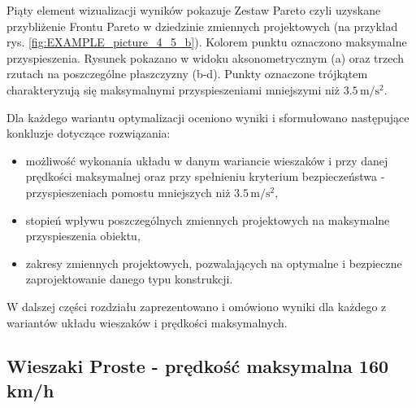 Piąty element wizualizacji wyników pokazuje Zestaw Pareto czyli uzyskane przybliżenie Frontu Pareto w dziedzinie zmiennych projektowych (na przykład rys. \ref{fig:EXAMPLE_picture_4_5_b}). Kolorem punktu oznaczono maksymalne przyspieszenia. Rysunek pokazano w widoku aksonometrycznym (a) oraz trzech rzutach na poszczególne płaszczyzny (b-d). Punkty oznaczone trójkątem charakteryzują się maksymalnymi przyspieszeniami mniejszymi niż $3.5\,\mathrm{m/s^2}$.

Dla każdego wariantu optymalizacji oceniono wyniki i sformułowano następujące konkluzje dotyczące rozwiązania:
\begin{itemize}
	\item możliwość wykonania układu w danym wariancie wieszaków i przy danej prędkości maksymalnej oraz przy spełnieniu kryterium bezpieczeństwa - przyspieszeniach pomostu mniejszych niż $3.5\,\mathrm{m/s^2}$,
	\item stopień wpływu poszczególnych zmiennych projektowych na maksymalne przyspieszenia obiektu,
	\item zakresy zmiennych projektowych, pozwalających na optymalne i bezpieczne zaprojektowanie danego typu konstrukcji.
\end{itemize} 

W dalszej części rozdziału zaprezentowano i omówiono wyniki dla każdego z wariantów układu wieszaków i prędkości maksymalnych.


\vfill
\pagebreak[4]
\subsection{Wieszaki Proste - prędkość maksymalna 160 km/h}

